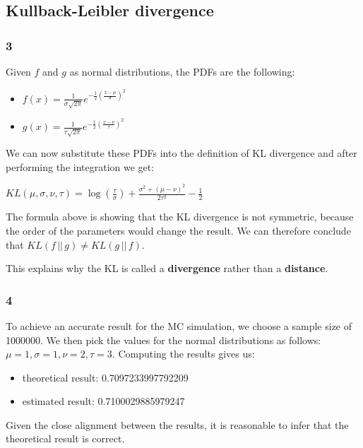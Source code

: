 \subsection{Kullback-Leibler divergence}

\subsubsection{3}

Given $f$ and $g$ as normal distributions, the PDFs are the following:
\begin{itemize}
    \item $f(x) = \frac{1}{\sigma \sqrt{2\pi}} e^{-\frac{1}{2}(\frac{x - \mu}{\sigma})^2}$
    \item $g(x) = \frac{1}{\tau \sqrt{2\pi}} e^{-\frac{1}{2}(\frac{x - \nu}{\tau})^2}$
\end{itemize}

We can now substitute these PDFs into the definition of KL divergence and after performing the integration we get: \\
\begin{center}
    $KL(\mu, \sigma, \nu, \tau) = \log(\frac{\tau}{\sigma}) + \frac{\sigma^2 +  (\mu - \nu)^2}{2\tau^2} - \frac{1}{2}$
\end{center}
The formula above is showing that the KL divergence is not symmetric, because the order of the parameters would
change the result. We can therefore conclude that $KL(f \,||\, g) \neq KL(g \,||\, f)$.


This explains why the KL is called a \textbf{divergence} rather than a \textbf{distance}.

\subsubsection{4}
To achieve an accurate result for the MC simulation, we choose a sample size of 1000000.
We then pick the values for
the normal distributions as follows: $\mu=1, \sigma=1, \nu=2, \tau=3$.
Computing the results gives us:
\begin{itemize}
    \item theoretical result: 0.7097233997792209
    \item estimated result: 0.7100029885979247
\end{itemize}

Given the close alignment between the results, it is reasonable to infer that the theoretical result is correct.